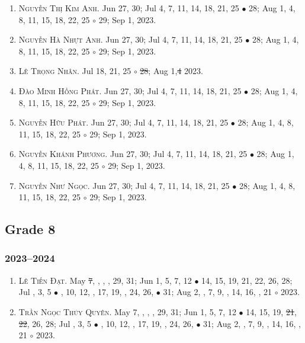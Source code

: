 \documentclass{article}
\begin{document}
\begin{enumerate}
	\item \textsc{Nguyễn Thị Kim Anh.} {\sf[In]} Jun 27, 30; Jul 4, 7, 11, 14, 18, 21, 25 $\bullet$ 28; Aug 1, 4, 8, 11, 15, 18, 22, 25 $\circ$ 29; Sep 1, 2023.
	\item \textsc{Nguyễn Hà Nhựt Anh.} {\sf[In]} Jun 27, 30; Jul 4, 7, 11, 14, 18, 21, 25 $\bullet$ 28; Aug 1, 4, 8, 11, 15, 18, 22, 25 $\circ$ 29; Sep 1, 2023.
	\item \textsc{Lê Trọng Nhân.} {\sf[In]} Jul 18, 21, 25 $\circ$ \st{28}; Aug 1,\st{4} \sf{[Out]} 2023.
	\item \textsc{Đào Minh Hồng Phát.} {\sf[In]} Jun 27, 30; Jul 4, 7, 11, 14, 18, 21, 25 $\bullet$ 28; Aug 1, 4, 8, 11, 15, 18, 22, 25 $\circ$ 29; Sep 1, 2023.
	\item \textsc{Nguyễn Hữu Phát.} {\sf[In]} Jun 27, 30; Jul 4, 7, 11, 14, 18, 21, 25 $\bullet$ 28; Aug 1, 4, 8, 11, 15, 18, 22, 25 $\circ$ 29; Sep 1, 2023.	
	\item \textsc{Nguyễn Khánh Phương.} {\sf[In]} Jun 27, 30; Jul 4, 7, 11, 14, 18, 21, 25 $\bullet$ 28; Aug 1, 4, 8, 11, 15, 18, 22, 25 $\circ$ 29; Sep 1, 2023.
	\item \textsc{Nguyễn Như Ngọc.} {\sf[In]} Jun 27, 30; Jul 4, 7, 11, 14, 18, 21, 25 $\bullet$ 28; Aug 1, 4, 8, 11, 15, 18, 22, 25 $\circ$ 29; Sep 1, 2023.
\end{enumerate}


\subsection{Grade 8}

\subsubsection{2023--2024}

\begin{enumerate}
	\item \textsc{Lê Tiến Đạt.} May \st{7}, , , , 29, 31; Jun 1, 5, 7, 12 $\bullet$ 14, 15, 19, 21, 22, 26, 28; Jul , 3, 5 $\bullet$ , 10, 12, , 17, 19, , 24, 26,  $\bullet$ 31; Aug 2, , 7, 9, , 14, 16, , 21 $\circ$ 2023.
	\item \textsc{Trần Ngọc Thúy Quyên.} May 7, , , , 29, 31; Jun 1, 5, 7, 12 $\bullet$ 14, 15, 19, \st{21}, \st{22}, 26, 28; Jul , 3, 5 $\bullet$ , 10, 12, , 17, 19, , 24, 26,  $\bullet$ 31; Aug 2, , 7, 9, , 14, 16, , 21 $\circ$ 2023.
\end{enumerate}
\end{document}
